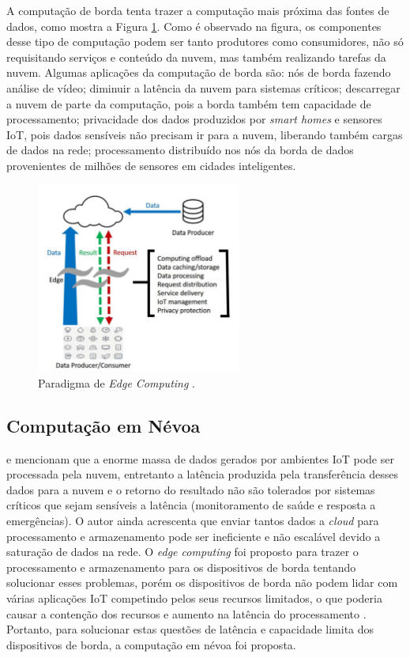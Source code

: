 A computação de borda tenta trazer a computação mais próxima das fontes de
dados, como mostra a Figura \ref{edge-computing}. Como é observado na figura, os
componentes desse tipo de computação podem ser tanto produtores como
consumidores, não só requisitando serviços e conteúdo da nuvem, mas também
realizando tarefas da nuvem. Algumas aplicações da computação de borda são: nós
de borda fazendo análise de vídeo; diminuir a latência da nuvem para sistemas
críticos; descarregar a nuvem de parte da computação, pois a borda também tem
capacidade de processamento; privacidade dos dados produzidos por \emph{smart
homes} e sensores IoT, pois dados sensíveis não precisam ir para a nuvem,
liberando também cargas de dados na rede; processamento distribuído nos nós da
borda de dados provenientes de milhões de sensores em cidades inteligentes.


\begin{figure}[ht]
\centering
\includegraphics[width=0.6\textwidth]{figuras/edge-computing.png}
\caption{Paradigma de \emph{Edge Computing} \cite{Shi2016}.}
\label{edge-computing}
\end{figure}

\subsection{Computação em Névoa}

 e 
mencionam que a enorme massa de dados gerados por ambientes IoT pode ser
processada pela nuvem, entretanto a latência produzida pela transferência desses
dados para a nuvem e o retorno do resultado não são tolerados por sistemas
críticos que sejam sensíveis a latência (monitoramento de saúde e resposta a
emergências). O autor ainda acrescenta que enviar tantos dados a \emph{cloud}
para processamento e armazenamento pode ser ineficiente e não escalável devido a
saturação de dados na rede. O \emph{edge computing} foi proposto para trazer o
processamento e armazenamento para os dispositivos de borda tentando solucionar
esses problemas, porém os dispositivos de borda não podem lidar com várias
aplicações IoT competindo pelos seus recursos limitados, o que poderia causar a
contenção dos recursos e aumento na latência do processamento
\cite{Dastjerdi2016}. Portanto, para solucionar estas questões de latência e
capacidade limita dos dispositivos de borda, a computação em névoa foi proposta.

